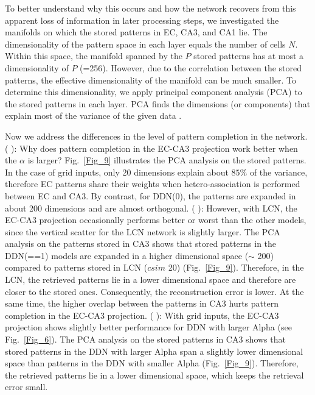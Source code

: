 \documentclass[utf8]{frontiersSCNS} %
\newcommand{\RN}[1]{%
  \textup{\uppercase\expandafter{\romannumeral#1}}%
}
\begin{document}
To better understand why this occurs and how the network recovers from this apparent loss of information in later processing steps, we investigated the manifolds on which the stored patterns in EC, CA3, and CA1 lie. The dimensionality of the pattern space in each layer equals the number of cells $N$. Within this space, the manifold spanned by the $P$ stored patterns has at most a dimensionality of $P$ (=256). However, due to the correlation between the stored patterns, the effective dimensionality of the manifold can be much smaller. To determine this dimensionality, we apply principal component analysis (PCA) to the stored patterns in each layer. PCA finds the dimensions (or components) that explain most of the variance of the given data \cite[chapter 4]{Hastie2009}. 

Now we address the differences in the level of pattern completion in the network. (\RN{1}): Why does pattern completion in the EC-CA3 projection work better when the $\alpha$ is larger? Fig.~\ref{Fig_9} illustrates the PCA analysis on the stored patterns. In the case of grid inputs, only 20 dimensions explain about $85 \%$ of the variance, therefore EC patterns share their weights when hetero-association is performed between EC and CA3. By contrast, for DDN(0), the patterns are expanded in about 200 dimensions and are almost orthogonal. (\RN{2}): 
However, with LCN, the EC-CA3 projection occasionally performs better or worst than the other models, since the vertical scatter for the LCN network is slightly larger. The PCA analysis on the patterns stored in CA3 shows that stored patterns in the DDN(==1) models are expanded in a higher dimensional space ($\sim$ 200) compared to patterns stored in LCN ($csim$ 20) (Fig.~\ref{Fig_9}). Therefore, in the LCN, the retrieved patterns lie in a lower dimensional space and therefore are closer to the stored ones. Consequently, the reconstruction error is lower. At the same time, the higher overlap between the patterns in CA3 hurts pattern completion in the EC-CA3 projection. (\RN{3}): With grid inputs, the EC-CA3 projection shows slightly better performance for DDN with larger Alpha (see Fig.~\ref{Fig_6}). The PCA analysis on the stored patterns in CA3 shows that stored patterns in the DDN with larger Alpha span a slightly lower dimensional space than patterns in the DDN with smaller Alpha (Fig.~\ref{Fig_9}). Therefore, the retrieved patterns lie in a lower dimensional space, which keeps the retrieval error small.
\end{document}
